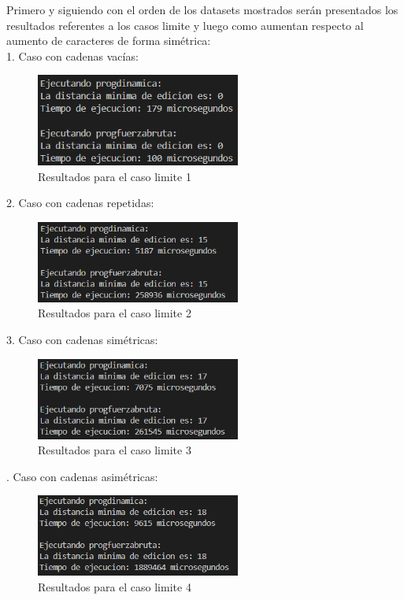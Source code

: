 Primero y siguiendo con el orden de los datasets mostrados serán presentados los resultados referentes a los casos limite y luego como aumentan respecto al aumento de caracteres de forma simétrica:\\

1. Caso con cadenas vacías: \\
\begin{figure}[ht]
  \centering
  \includegraphics[width=0.6\textwidth]{./images/Resultados1.png}
  \caption{Resultados para el caso limite 1}
  \label{fig:imagen}
\end{figure}

2. Caso con cadenas repetidas:\\
\begin{figure}[ht]
  \centering
  \includegraphics[width=0.6\textwidth]{./images/Resultados2.png}
  \caption{Resultados para el caso limite 2}
  \label{fig:imagen}
\end{figure}

3. Caso con cadenas simétricas:\\
\begin{figure}[ht]
  \centering
  \includegraphics[width=0.6\textwidth]{./images/Resultados3.png}
  \caption{Resultados para el caso limite 3}
  \label{fig:imagen}
\end{figure}
. Caso con cadenas asimétricas:\\
\begin{figure}[ht]
  \centering
  \includegraphics[width=0.6\textwidth]{./images/Resultados4.png}
  \caption{Resultados para el caso limite 4}
  \label{fig:imagen}
\end{figure}

